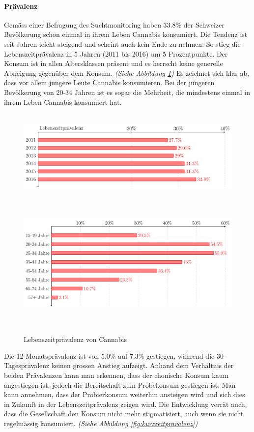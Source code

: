 \documentclass[../main.tex]{subfiles}
\begin{document}
	\paragraph{Prävalenz}	
	Gemäss einer Befragung des Suchtmonitoring haben 33.8\% der Schweizer Bevölkerung schon einmal in ihrem Leben Cannabis konsumiert.
	Die Tendenz ist seit Jahren leicht steigend und scheint auch kein Ende zu nehmen. 
	So stieg die Lebenszeitprävalenz in 5 Jahren (2011 bis 2016) um 5 Prozentpunkte. 
	Der Konsum ist in allen Altersklassen präsent und es herrscht keine generelle Abneigung gegenüber dem Konsum. 
	\textit{(Siehe Abbildung \ref{fig:langzeitpravalenz})}
	Es zeichnet sich klar ab, dass vor allem jüngere Leute Cannabis konsumieren. 
	Bei der jüngeren Bevölkerung von 20-34 Jahren ist es sogar die Mehrheit, die mindestens einmal in ihrem Leben Cannabis konsumiert hat.	
	
	\noindent	 
	\begin{figure}[H]
		\raggedleft
		\includegraphics[height=4.56cm]{../figures/druguse-longtime}
		\includegraphics[height=6.71cm]{../figures/druguse-longtime-age}
		\captionsetup{font=small}
		\caption[Lebenszeitprävalenz von Cannabis]{Lebenszeitprävalenz von Cannabis\protect\footnotemark}
		\label{fig:langzeitpravalenz}		
	\end{figure}%
	
	
	\noindent
	Die 12-Monatsprävalenz ist von 5.0\% auf 7.3\% gestiegen, während die 30-Tagesprävalenz keinen grossen Anstieg aufzeigt. 
	Anhand dem Verhältnis der beiden Prävalenzen kann man erkennen, dass der chonische Konsum kaum angestiegen ist, jedoch die Bereitschaft zum Probekonsum gestiegen ist. 
	Man kann annehmen, dass der Probierkonsum weiterhin ansteigen wird und sich dies in Zukunft in der Lebenszeitprävalenz zeigen wird.
	Die Entwicklung verrät auch, dass die Gesellschaft den Konsum nicht mehr stigmatisiert, auch wenn sie nicht regelmässig konsumiert.
	\textit{(Siehe Abbildung \ref{fig:kurzzeitpravalenz})}
	
\end{document}
